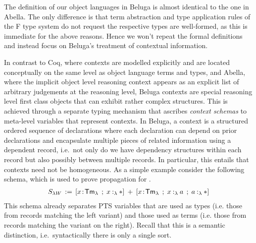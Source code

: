 The definition of our object languages in Beluga is almost identical to the one in Abella.
The only difference is that term abstraction and type application rules of the F type system do not request the respective types are well-formed, as this is immediate for the above reasons.
Hence we won't repeat the formal definitions and instead focus on Beluga's treatment of contextual information.

In contrast to Coq, where contexts are modelled explicitly and are located conceptually on the same level as object language terms and types, and Abella, where the implicit object level reasoning context appears as an explicit list of arbitrary judgements at the reasoning level, Beluga contexts are special reasoning level first class objects that can exhibit rather complex structures.
%
This is achieved through a separate typing mechanism that ascribes \emph{context schemas} to meta-level variables that represent contexts.
In Beluga, a context is a structured ordered sequence of declarations where each declaration can depend on prior declarations and encapsulate multiple pieces of related information using a dependent record, i.e.~not only do we have dependency structures within each record but also possibly between multiple records.
In particular, this entails that contexts need not be homogeneous.
As a simple example consider the following schema, which is used to prove propagation for \SysL.
\begin{align*}
  S_{\lambda W} \eqdef [x\of\TmL \mrel{;} \typingLh{x}{\Prp}] \mrel{+} [x\of\TmL \mrel{;} \typingLh{x}{a} \mrel{;} \typingLh{a}{\Prp}]
\end{align*}
This schema already separates PTS variables that are used as types (i.e. those from records matching the left variant) and those used as terms (i.e. those from records matching the variant on the right).
Recall that this is a semantic distinction, i.e.~syntactically there is only a single sort.

